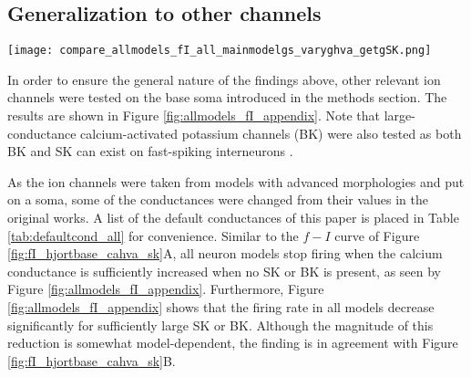 \documentclass[times, twoside]{zHenriquesLab-StyleBioRxiv}
\begin{document}
\subsection*{Generalization to other channels}

\begin{figure*}
\centering
\texttt{[image: compare\_allmodels\_fI\_all\_mainmodelgs\_varyghva\_getgSK.png]}
\caption{$f-I$ curves for different combinations of ion channel models over a range of calcium conductances without SK or BK present, as well as for one value of $\bar{g}_\text{SK}$ or $\bar{g}_\text{BK}$. A) CaHVA (Allen) and bk (Hjorth), B) CaHVA (Allen) and BK (Zhang), C) CaHVA (Allen) and BK (Ait Ouares), D) CaHVA (Allen) and SK (Ait Ouares), E) CaHVA (Allen) and SK (Allen), F) CaN (Konstantoudaki) and bk (Hjorth), G) CaN (Konstantoudaki) and BK (Zhang), H) CaN (Konstantoudaki) and BK (Ait Ouares), I) CaN (Konstantoudaki) and SK (Ait Ouares), J) CaN (Konstantoudaki) and SK (Allen), K) CaQ (Hjorth) and bk (Hjorth), L) CaQ (Hjorth) and BK (Zhang), M) CaQ (Hjorth) and BK (Ait Ouares), N) CaQ (Hjorth) and SK (Ait Ouares), O) CaQ (Hjorth) and SK (Allen). The cell models consist of the channels mentioned as well as channels naf and kaf from Hjorth et al. and a standard leak channel. The default parameters are listed in Table \ref{tab:defaultcond_all}.}
\label{fig:allmodels_fI_appendix}
\end{figure*}

In order to ensure the general nature of the findings above, other relevant ion channels were tested on the base soma introduced in the methods section. The results are shown in Figure \ref{fig:allmodels_fI_appendix}. Note that large-conductance calcium-activated potassium channels (BK) were also tested as both BK and SK can exist on fast-spiking interneurons \cite{orduz_parvalbumin_2013,goldberg_specific_2005}. 

As the ion channels were taken from models with advanced morphologies and put on a soma, some of the conductances were changed from their values in the original works. A list of the default conductances of this paper is placed in Table \ref{tab:defaultcond_all} for convenience. %
Similar to the $f-I$ curve of Figure \ref{fig:fI_hjortbase_cahva_sk}A, all neuron models stop firing when the calcium conductance is sufficiently increased when no SK or BK is present, as seen by Figure \ref{fig:allmodels_fI_appendix}. Furthermore, Figure \ref{fig:allmodels_fI_appendix} shows that the firing rate in all models decrease significantly for sufficiently large SK or BK. Although the magnitude of this reduction is somewhat model-dependent, the finding is in agreement with Figure \ref{fig:fI_hjortbase_cahva_sk}B.
\end{document}

